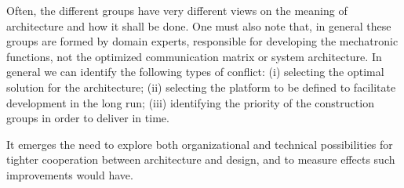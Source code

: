 Often, the %
different groups 
have very different views on the meaning
of architecture and how it shall be done. One must also note that, in general these groups are formed by domain experts, responsible for developing the mechatronic functions, not the optimized communication matrix or system architecture. In general we can identify the following types of conflict:
(i) %
selecting the optimal solution for the %
architecture; %
(ii) %
selecting the platform %
to be defined to facilitate development in the long run; %
(iii) %
identifying the priority of the construction groups in order to deliver in time. %



It emerges the need to explore both organizational and technical
possibilities for tighter cooperation between architecture and design, and to
measure effects such improvements would have. 


